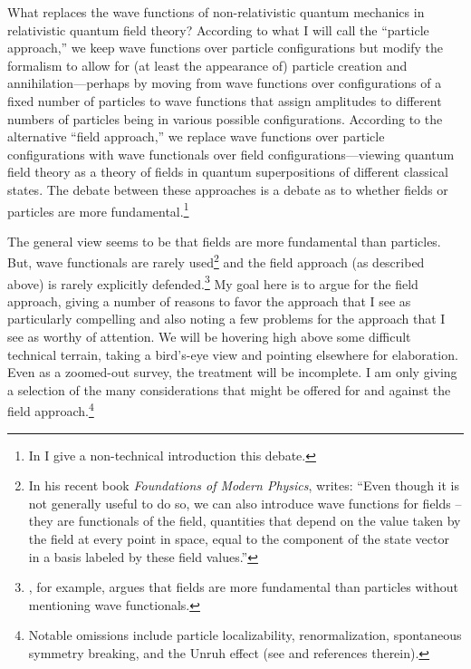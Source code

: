 \documentclass[onecolumn,secnumarabic,amsmath,amssymb,balancelastpage,nofootinbib]{article}
\begin{document}
What replaces the wave functions of non-relativistic quantum mechanics in relativistic quantum field theory?  According to what I will call the ``particle approach,'' we keep wave functions over particle configurations but modify the formalism to allow for (at least the appearance of) particle creation and annihilation---perhaps by moving from wave functions over configurations of a fixed number of particles to wave functions that assign amplitudes to different numbers of particles being in various possible configurations.  According to the alternative ``field approach,'' we replace wave functions over particle configurations with wave functionals over field configurations---viewing quantum field theory as a theory of fields in quantum superpositions of different classical states.  The debate between these approaches is a debate as to whether fields or particles are more fundamental.\footnote{In \citet{sebensAeon} I give a non-technical introduction this debate.}

The general view seems to be that fields are more fundamental than particles.  But, wave functionals are rarely used\footnote{In his recent book \emph{Foundations of Modern Physics}, \citet[pg.\ 251--252]{weinberg2021} writes: ``Even though it is not generally useful to do so, we can also introduce wave functions for fields -- they are functionals of the field, quantities that depend on the value taken by the field at every point in space, equal to the component of the state vector in a basis labeled by these field values.''} and the field approach (as described above) is rarely explicitly defended.\footnote{\citet{hobson2013}, for example, argues that fields are more fundamental than particles without mentioning wave functionals.}  My goal here is to argue for the field approach, giving a number of reasons to favor the approach that I see as particularly compelling and also noting a few problems for the approach that I see as worthy of attention.  We will be hovering high above some difficult technical terrain, taking a bird's-eye view and pointing elsewhere for elaboration.  Even as a zoomed-out survey, the treatment will be incomplete.  I am only giving a selection of the many considerations that might be offered for and against the field approach.\footnote{Notable omissions include particle localizability, renormalization, spontaneous symmetry breaking, and the Unruh effect (see \citealp{barrett2002, lupher2010, earman2011unruh, ruetsche2011, myrvold2015, baker2016, wallace2021, wallace2022} and references therein).}
\end{document}
